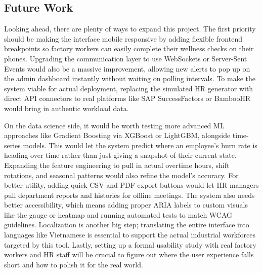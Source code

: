 \documentclass[12pt,a4paper]{article}
\begin{document}
\subsection{Future Work}
\label{subsec:future}

Looking ahead, there are plenty of ways to expand this project. The first priority should be making the interface mobile responsive by adding flexible frontend breakpoints so factory workers can easily complete their wellness checks on their phones. Upgrading the communication layer to use WebSockets or Server-Sent Events would also be a massive improvement, allowing new alerts to pop up on the admin dashboard instantly without waiting on polling intervals. To make the system viable for actual deployment, replacing the simulated HR generator with direct API connectors to real platforms like SAP SuccessFactors or BambooHR would bring in authentic workload data.

On the data science side, it would be worth testing more advanced ML approaches like Gradient Boosting via XGBoost or LightGBM, alongside time-series models. This would let the system predict where an employee's burn rate is heading over time rather than just giving a snapshot of their current state. Expanding the feature engineering to pull in actual overtime hours, shift rotations, and seasonal patterns would also refine the model's accuracy. For better utility, adding quick CSV and PDF export buttons would let HR managers pull department reports and histories for offline meetings. The system also needs better accessibility, which means adding proper ARIA labels to custom visuals like the gauge or heatmap and running automated tests to match WCAG guidelines. Localization is another big step; translating the entire interface into languages like Vietnamese is essential to support the actual industrial workforces targeted by this tool. Lastly, setting up a formal usability study with real factory workers and HR staff will be crucial to figure out where the user experience falls short and how to polish it for the real world.




\newpage
{}
\renewcommand{\refname}{LIST OF REFERENCES}
\end{document}
